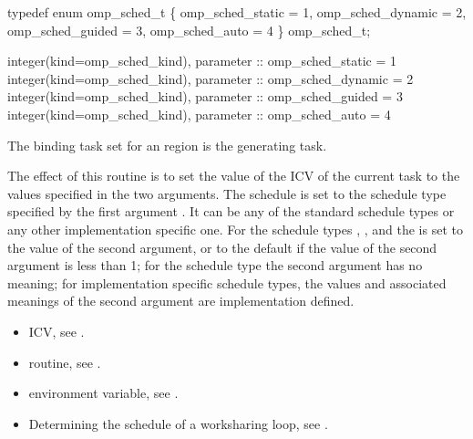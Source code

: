 \pagebreak
\ccppspecificstart
\begin{boxedcode}
typedef enum omp\_sched\_t \{
    omp\_sched\_static = 1,
    omp\_sched\_dynamic = 2,
    omp\_sched\_guided = 3,
    omp\_sched\_auto = 4
\} omp\_sched\_t;
\end{boxedcode}
\ccppspecificend

\begin{samepage}
\fortranspecificstart
\begin{boxedcode}
integer(kind=omp\_sched\_kind), parameter :: omp\_sched\_static = 1
integer(kind=omp\_sched\_kind), parameter :: omp\_sched\_dynamic = 2
integer(kind=omp\_sched\_kind), parameter :: omp\_sched\_guided = 3
integer(kind=omp\_sched\_kind), parameter :: omp\_sched\_auto = 4
\end{boxedcode}
\fortranspecificend
\end{samepage}

\binding
The binding task set for an  region is the generating task. 

\effect
The effect of this routine is to set the value of the  ICV of the current task 
to the values specified in the two arguments. The schedule is set to the schedule type 
specified by the first argument . It can be any of the standard schedule types or 
any other implementation specific one. For the schedule types , , and 
 the  is set to the value of the second argument, or to the default 
 if the value of the second argument is less than 1; for the schedule type 
 the second argument has no meaning; for implementation specific schedule types, 
the values and associated meanings of the second argument are implementation defined.

\crossreferences
\begin{itemize}
\item {} ICV, see 
.

\item {} routine, see 
.

\item {} environment variable, see 
.

\item Determining the schedule of a worksharing loop, see 
.
\end{itemize}









